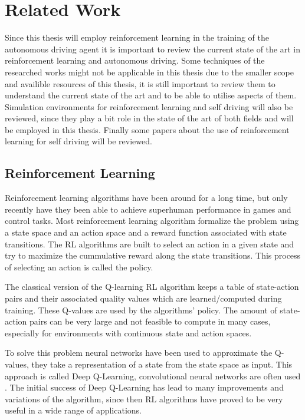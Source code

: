 \chapter{Related Work}
\label{cha:Related Work}

Since this thesis will employ reinforcement learning in the training of the autonomous driving agent it is important to review the current state of the art in reinforcement learning and autonomous driving. Some techniques of the researched works might not be applicable in this thesis due to the smaller scope and availible resources of this thesis, it is still important to review them to understand the current state of the art and to be able to utilise aspects of them. Simulation environments for reinforcement learning and self driving will also be reviewed, since they play a bit role in the state of the art of both fields and will be employed in this thesis.
Finally some papers about the use of reinforcement learning for self driving will be reviewed.


\section{Reinforcement Learning}

Reinforcement learning algorithms have been around for a long time, but only recently have they been able to achieve superhuman performance in games and control tasks. Most reinforcement learning algorithm formalize the problem using a state space and an action space and a reward function associated with state transitions. The RL algorithms are built to select an action in a given state and try to maximize the cummulative reward along the state transitions. This process of selecting an action is called the policy.

The classical version of the Q-learning RL algorithm keeps a table of state-action pairs and their associated quality values which are learned/computed during training. These Q-values are used by the algorithms' policy. The amount of state-action pairs can be very large and not feasible to compute in many cases, especially for environments with continuous state and action spaces. %

To solve this problem neural networks have been used to approximate the Q-values, they take a representation of a state from the state space as input. This approach is called Deep Q-Learning, convolutional neural networks are often used \autocite{atari}. The initial success of Deep Q-Learning has lead to many improvements and variations of the algorithm, since then RL algorithms have proved to be very useful in a wide range of applications.


